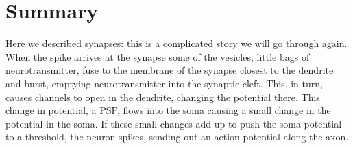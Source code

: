 \documentclass[12pt]{article}
\begin{document}
\section{Summary}

Here we described synapses: this is a complicated story we will go
through again. When the spike arrives at the synapse some of the
vesicles, little bags of neurotransmitter, fuse to the membrane of the
synapse closest to the dendrite and burst, emptying neurotransmitter
into the synaptic cleft. This, in turn, causes channels to open in the
dendrite, changing the potential there. This change in potential, a
PSP, flows into the soma causing a small change in the potential in
the soma. If these small changes add up to push the soma potential to
a threshold, the neuron spikes, sending out an action potential along
the axon.



{}
\end{document}
